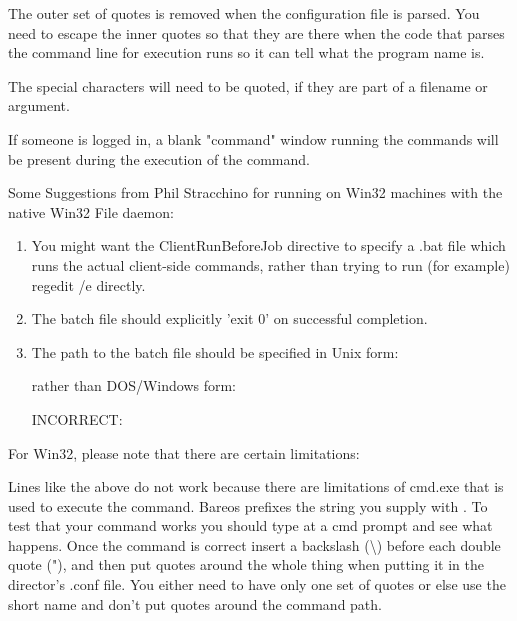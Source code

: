 {The outer set of quotes is removed when the configuration file is parsed.
You need to escape the inner quotes so that they are there when the code
that parses the command line for execution runs so it can tell what the
program name is.


The special characters \configCharsToQuote
will need to be quoted,
if they are part of a filename or argument.

If someone is logged in, a blank "command" window running the commands
will be present during the execution of the command.

Some Suggestions from Phil Stracchino for running on Win32 machines with
the native Win32 File daemon:

\begin{enumerate}
\item You might want the ClientRunBeforeJob directive to specify a .bat
      file which runs the actual client-side commands, rather than trying
      to run (for example) regedit /e directly.
\item The batch file should explicitly 'exit 0' on successful completion.
\item The path to the batch file should be specified in Unix form:


    rather than DOS/Windows form:

    INCORRECT: 
\end{enumerate}

For Win32, please note that there are certain limitations:


Lines like the above do not work because there are limitations of
cmd.exe that is used to execute the command.
Bareos prefixes the string you supply with .  To test that
your command works you should type  at a
cmd prompt and see what happens.  Once the command is correct insert a
backslash (\textbackslash{}) before each double quote ("), and
then put quotes around the whole thing when putting it in
the director's .conf file.  You either need to have only one set of quotes
or else use the short name and don't put quotes around the command path.

}
